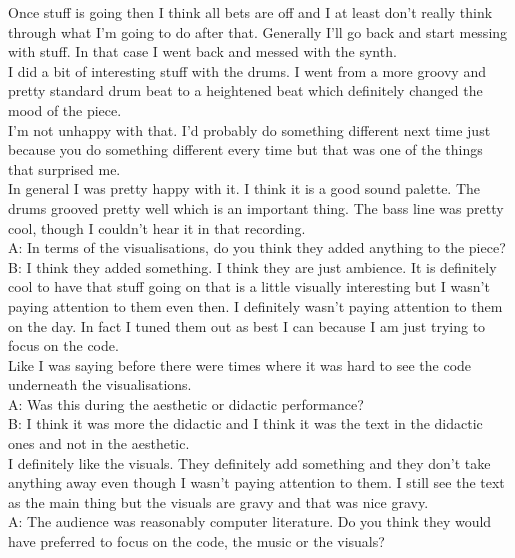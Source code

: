 Once stuff is going then I think all bets are off and I at least don't really think through what I'm going to do after that. Generally I'll go back and start messing with stuff. In that case I went back and messed with the synth.\\

I did a bit of interesting stuff with the drums. I went from a more groovy and pretty standard drum beat to a heightened beat which definitely changed the mood of the piece.\\

I'm not unhappy with that. I'd probably do something different next time just because you do something different every time but that was one of the things that surprised me.\\

In general I was pretty happy with it. I think it is a good sound palette. The drums grooved pretty well which is an important thing. The bass line was pretty cool, though I couldn't hear it in that recording.\\

A: In terms of the visualisations, do you think they added anything to the piece?\\

B: I think they added something. I think they are just ambience. It is definitely cool to have that stuff going on that is a little visually interesting but I wasn't paying attention to them even then. I definitely wasn't paying attention to them on the day. In fact I tuned them out as best I can because I am just trying to focus on the code.\\

Like I was saying before there were times where it was hard to see the code underneath the visualisations.\\

A: Was this during the aesthetic or didactic performance?\\

B: I think it was more the didactic and I think it was the text in the didactic ones and not in the aesthetic.\\

I definitely like the visuals. They definitely add something and they don't take anything away even though I wasn't paying attention to them. I still see the text as the main thing but the visuals are gravy and that was nice gravy.\\

A: The audience was reasonably computer literature. Do you think they would have preferred to focus on the code, the music or the visuals?\\

